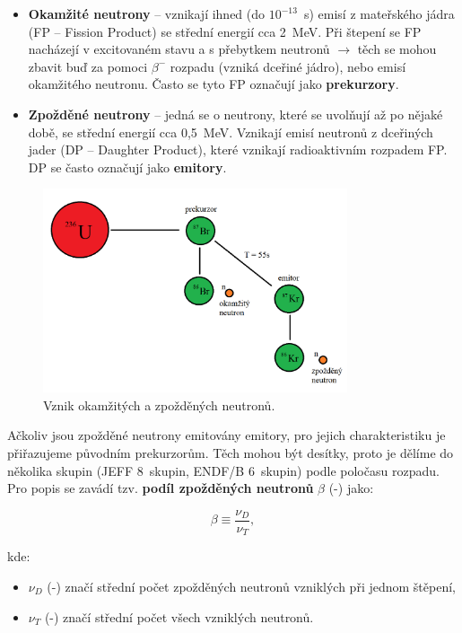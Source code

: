 \begin{itemize}
  \item \textbf{Okamžité neutrony} -- vznikají ihned (do $10^{-13}$~s) emisí z mateřského jádra (FP -- Fission Product) se střední energií cca 2~MeV. Při štepení se FP nacházejí v excitovaném stavu a s přebytkem neutronů $\rightarrow$ těch se mohou zbavit buď za pomoci $\beta^-$ rozpadu (vzniká dceřiné jádro), nebo emisí okamžitého neutronu. Často se tyto FP označují jako \textbf{prekurzory}.
  \item \textbf{Zpožděné neutrony} -- jedná se o neutrony, které se uvolňují až po nějaké době, se střední energií cca 0,5~MeV. Vznikají emisí neutronů z dceřiných jader (DP -- Daughter Product), které vznikají radioaktivním rozpadem FP. DP se často označují jako \textbf{emitory}.
\end{itemize}

\begin{figure}[H]
  \centering
  \includegraphics[width=0.8\textwidth]{img/1.png}
  \caption{Vznik okamžitých a zpožděných neutronů.}
  \label{fig_zpozdenky}
\end{figure}

Ačkoliv jsou zpožděné neutrony emitovány emitory, pro jejich charakteristiku je přiřazujeme původním prekurzorům. Těch mohou být desítky, proto je dělíme do několika skupin (JEFF 8~skupin, ENDF/B 6~skupin) podle poločasu rozpadu. Pro popis se zavádí tzv. \textbf{podíl zpožděných neutronů} $\beta$ (-) jako:

\begin{equation}
  \boxed{
  \beta \equiv \dfrac{\nu_D}{\nu_T},
  \label{zpozdenky}}
\end{equation}

kde:

\begin{itemize}
  \item $\nu_D$ (-) značí střední počet zpožděných neutronů vzniklých při jednom štěpení,
  \item $\nu_T$ (-) značí střední počet všech vzniklých neutronů.
\end{itemize}

